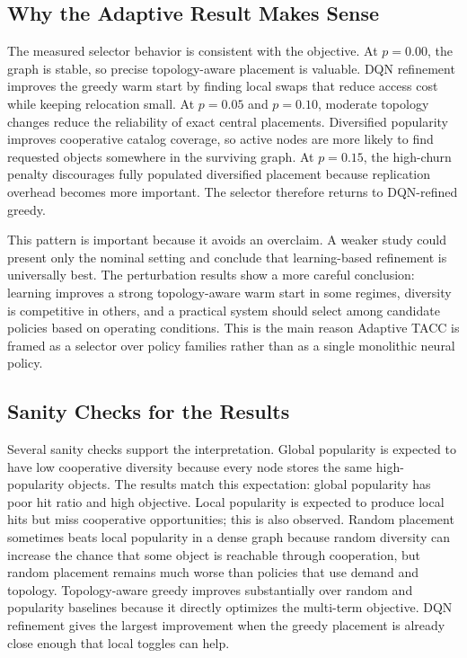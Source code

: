 \subsection{Why the Adaptive Result Makes Sense}

The measured selector behavior is consistent with the objective. At \(p=0.00\), the graph is stable, so precise topology-aware placement is valuable. DQN refinement improves the greedy warm start by finding local swaps that reduce access cost while keeping relocation small. At \(p=0.05\) and \(p=0.10\), moderate topology changes reduce the reliability of exact central placements. Diversified popularity improves cooperative catalog coverage, so active nodes are more likely to find requested objects somewhere in the surviving graph. At \(p=0.15\), the high-churn penalty discourages fully populated diversified placement because replication overhead becomes more important. The selector therefore returns to DQN-refined greedy.

This pattern is important because it avoids an overclaim. A weaker study could present only the nominal setting and conclude that learning-based refinement is universally best. The perturbation results show a more careful conclusion: learning improves a strong topology-aware warm start in some regimes, diversity is competitive in others, and a practical system should select among candidate policies based on operating conditions. This is the main reason Adaptive TACC is framed as a selector over policy families rather than as a single monolithic neural policy.

\subsection{Sanity Checks for the Results}

Several sanity checks support the interpretation. Global popularity is expected to have low cooperative diversity because every node stores the same high-popularity objects. The results match this expectation: global popularity has poor hit ratio and high objective. Local popularity is expected to produce local hits but miss cooperative opportunities; this is also observed. Random placement sometimes beats local popularity in a dense graph because random diversity can increase the chance that some object is reachable through cooperation, but random placement remains much worse than policies that use demand and topology. Topology-aware greedy improves substantially over random and popularity baselines because it directly optimizes the multi-term objective. DQN refinement gives the largest improvement when the greedy placement is already close enough that local toggles can help.

